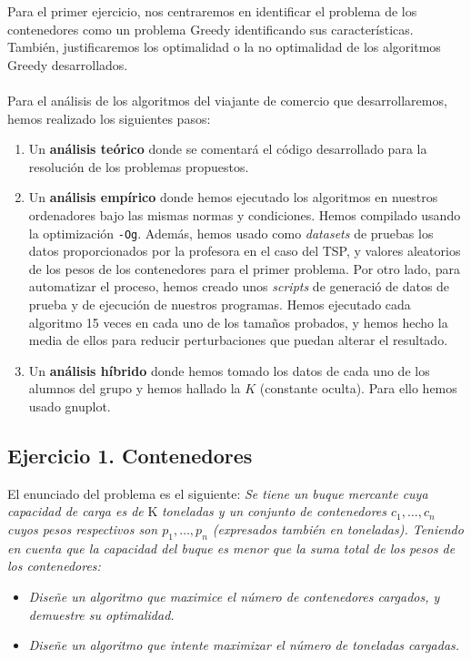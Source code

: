 \documentclass[10pt,a4paper]{article}
\begin{document}
Para el primer ejercicio, nos centraremos en identificar el problema de los contenedores como un problema Greedy identificando sus características. También, justificaremos los optimalidad o la no optimalidad de los algoritmos Greedy desarrollados.
\\
\\
Para el análisis de los algoritmos del viajante de comercio que desarrollaremos, hemos realizado los siguientes pasos:

\begin{enumerate}
	\item Un \textbf{análisis teórico} donde se comentará el código desarrollado para la resolución de los problemas propuestos.
	
	\item Un \textbf{análisis empírico} donde hemos ejecutado los algoritmos en nuestros ordenadores bajo las mismas normas y condiciones. Hemos compilado usando la optimización \texttt{-Og}. Además, hemos usado como \textit{datasets} de pruebas los datos proporcionados por la profesora en el caso del TSP, y valores aleatorios de los pesos de los contenedores para el primer problema. Por otro lado, para automatizar el proceso, hemos creado unos \textit{scripts} de generació  de datos de prueba y de ejecución de nuestros programas. Hemos ejecutado cada algoritmo 15 veces en cada uno de los tamaños probados, y hemos hecho la media de ellos para reducir perturbaciones que puedan alterar el resultado.
	
	\item Un \textbf{análisis híbrido} donde hemos tomado los datos de cada uno de los alumnos del grupo y hemos hallado la \(K\) (constante oculta). Para ello hemos usado gnuplot.
\end{enumerate}

\subsection{Ejercicio 1. Contenedores}

El enunciado del problema es el siguiente: \textit{Se tiene un buque mercante cuya capacidad de carga es de } K \textit{toneladas y un conjunto de contenedores \(c_1, \dotsc, c_n\) cuyos pesos respectivos son \(p_1, \dotsc, p_n\) (expresados también en toneladas). Teniendo en cuenta que la capacidad del buque es menor que la suma total de los pesos de los contenedores: }

\begin{itemize}
	\item \textit{Diseñe un algoritmo que maximice el número de contenedores cargados, y demuestre su optimalidad.}
	\item \textit{Diseñe un algoritmo que intente maximizar el número de toneladas cargadas.}
\end{itemize}
\end{document}
